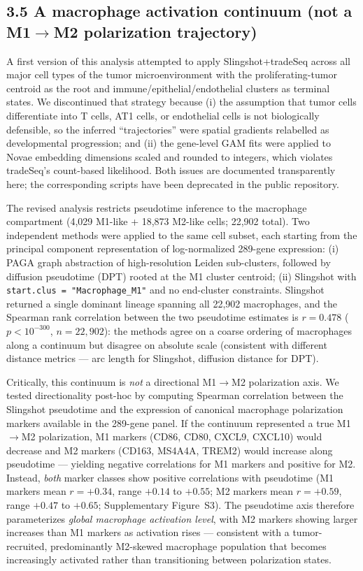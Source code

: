 \documentclass[12pt,a4paper]{article}
\begin{document}
\subsection*{3.5 A macrophage activation continuum (not a M1$\to$M2 polarization trajectory)}
A first version of this analysis attempted to apply Slingshot+tradeSeq across all major cell types of the tumor microenvironment with the proliferating-tumor centroid as the root and immune/epithelial/endothelial clusters as terminal states. We discontinued that strategy because (i) the assumption that tumor cells differentiate into T cells, AT1 cells, or endothelial cells is not biologically defensible, so the inferred ``trajectories'' were spatial gradients relabelled as developmental progression; and (ii) the gene-level GAM fits were applied to Novae embedding dimensions scaled and rounded to integers, which violates tradeSeq's count-based likelihood. Both issues are documented transparently here; the corresponding scripts have been deprecated in the public repository.

The revised analysis restricts pseudotime inference to the macrophage compartment (4,029 M1-like + 18,873 M2-like cells; 22,902 total). Two independent methods were applied to the same cell subset, each starting from the principal component representation of log-normalized 289-gene expression: (i) PAGA \citep{wolf2019paga} graph abstraction of high-resolution Leiden sub-clusters, followed by diffusion pseudotime (DPT) \citep{haghverdi2016dpt} rooted at the M1 cluster centroid; (ii) Slingshot \citep{street2018slingshot} with \texttt{start.clus = "Macrophage\_M1"} and no end-cluster constraints. Slingshot returned a single dominant lineage spanning all 22,902 macrophages, and the Spearman rank correlation between the two pseudotime estimates is $r = 0.478$ ($p < 10^{-300}$, $n = 22{,}902$): the methods agree on a coarse ordering of macrophages along a continuum but disagree on absolute scale (consistent with different distance metrics --- arc length for Slingshot, diffusion distance for DPT).

Critically, this continuum is \emph{not} a directional M1$\to$M2 polarization axis. We tested directionality post-hoc by computing Spearman correlation between the Slingshot pseudotime and the expression of canonical macrophage polarization markers available in the 289-gene panel. If the continuum represented a true M1$\to$M2 polarization, M1 markers (CD86, CD80, CXCL9, CXCL10) would decrease and M2 markers (CD163, MS4A4A, TREM2) would increase along pseudotime --- yielding negative correlations for M1 markers and positive for M2. Instead, \emph{both} marker classes show positive correlations with pseudotime (M1 markers mean $r = +0.34$, range $+0.14$ to $+0.55$; M2 markers mean $r = +0.59$, range $+0.47$ to $+0.65$; Supplementary Figure~S3). The pseudotime axis therefore parameterizes \emph{global macrophage activation level}, with M2 markers showing larger increases than M1 markers as activation rises --- consistent with a tumor-recruited, predominantly M2-skewed macrophage population that becomes increasingly activated rather than transitioning between polarization states.
\end{document}
